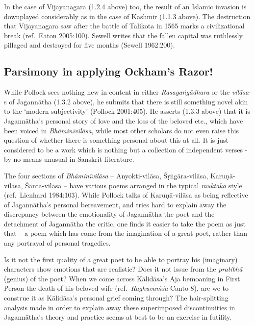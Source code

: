In the case of Vijayanagara (1.2.4 above) too, the result of an Islamic invasion is downplayed considerably as in the case of Kashmir (1.1.3 above). The destruction that Vijayanagara saw after the battle of Talikota in 1565 marks a civilizational break (ref.\ Eaton 2005:100). Sewell writes that the fallen capital was ruthlessly pillaged and destroyed for five months (Sewell 1962:200).

\subsection{Parsimony in applying Ockham’s Razor!}

While Pollock sees nothing new in content in either {\sl Rasagaṅgādhara} or the {\sl vilāsa}-s of Jagannātha (1.3.2 above), he submits that there is still something novel akin to the ‘modern subjectivity’ (Pollock 2001:405). He asserts (1.3.3 above) that it is Jagannātha’s personal story of love and the loss of the beloved etc., which have been voiced in {\sl Bhāminīvilāsa}, while most other scholars do not even raise this question of whether there is something personal about this at all.  It is just considered to be a work which is nothing but a collection of independent verses - by no means unusual in Sanskrit literature.
\newpage

The four sections of {\sl Bhāminīvilāsa} – Anyokti-vilāsa, Śṛṅgāra-vilāsa, Karuṇā-vilāsa, Śānta-vilāsa – have various poems arranged in the typical {\sl muktaka} style (ref.\ Lienhard 1984:103). While Pollock talks of Karuṇā-vilāsa as being reflective of Jagannātha’s personal bereavement, and tries hard to explain away the discrepancy between the emotionality of Jagannātha the poet and the detachment of Jagannātha the critic, one finds it easier to take the poem as just that – a poem which has come from the imagination of a great poet, rather than any portrayal of personal tragedies. 
\vskip 2pt

Is it not the first quality of a great poet to be able to portray his (imaginary) characters show emotions that are realistic? Does it not issue from the {\sl pratibhā} (genius) of the poet? When we come across Kālidāsa’s Aja bemoaning in First Person the death of his beloved wife (ref.\ {\sl Raghuvaṁśa} Canto 8), are we to construe it as Kālidāsa’s personal grief coming through? The hair-splitting analysis made in order to explain away these superimposed discontinuities in Jagannātha’s theory and practice seems at best to be an exercise in futility.
\smallskip

